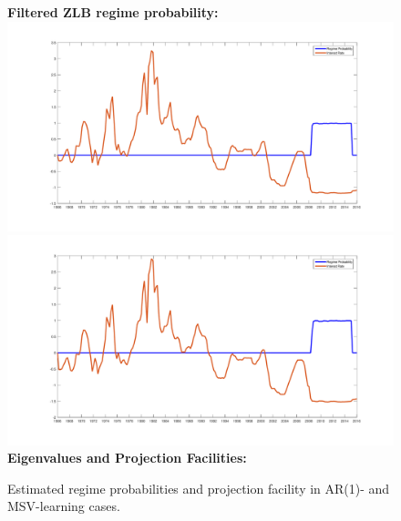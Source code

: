 \documentclass[12pt,reqno]{article}
\numberwithin{equation}{section}
\begin{document}
\begin{figure}[H]

\caption{Estimated regime probabilities and projection facility in AR(1)- and MSV-learning cases.}
\label{sw_regime_prob}
\vspace{5 mm}
\textbf{Filtered ZLB regime probability:}\\

\includegraphics[scale=0.23]{sw_ar1_regimeProb.pdf}
\includegraphics[scale=0.23]{sw_msv_regimeProb.pdf}\\

\textbf{Eigenvalues and Projection Facilities:}\\


\end{figure}
\end{document}
